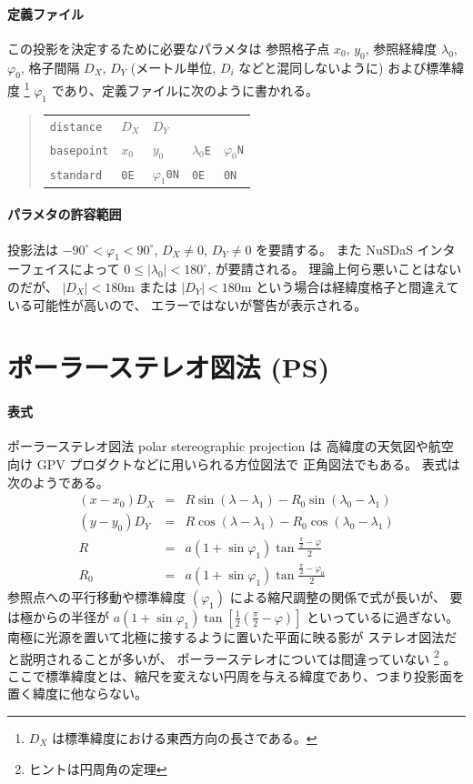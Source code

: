 \paragraph{定義ファイル}
この投影を決定するために必要なパラメタは
参照格子点 \(x_0\), \(y_0\),
参照経緯度 \(\lambda_0\), \(\varphi_0\),
格子間隔 \(D_X\), \(D_Y\) (メートル単位, \(D_i\) などと混同しないように)
および標準緯度%
\footnote{
	$D_X$ は標準緯度における東西方向の長さである。
}%
\(\varphi_1\)
であり、定義ファイルに次のように書かれる。
\begin{quote}
\begin{tabular}{lllll}
{\tt distance}	& $D_X$ & $D_Y$ & & \\
{\tt basepoint}	& $x_0$ & $y_0$	& $\lambda_0${\tt E} & $\varphi_0${\tt N} \\
{\tt standard}	& {\tt 0E} & $\varphi_1${\tt 0N} & {\tt 0E} & {\tt 0N} \\
\end{tabular}
\end{quote}

\paragraph{パラメタの許容範囲}
投影法は
\(-90^\circ < \varphi_1 < 90^\circ\),
\(D_X \ne 0\),
\(D_Y \ne 0\)
を要請する。
また NuSDaS インターフェイスによって
\(0 \le |\lambda_0| < 180^\circ\),
が要請される。
理論上何ら悪いことはないのだが、
\(|D_X| < 180\)m
または
\(|D_Y| < 180\)m
という場合は経緯度格子と間違えている可能性が高いので、
エラーではないが警告が表示される。

\section{ポーラーステレオ図法 (PS)}

\paragraph{表式}
ポーラーステレオ図法 polar stereographic projection は
高緯度の天気図や航空向け GPV プロダクトなどに用いられる方位図法で
正角図法でもある。
表式は次のようである。
\begin{eqnarray}
 (x - x_0) D_X &=& R \sin(\lambda-\lambda_1) - R_0 \sin(\lambda_0-\lambda_1)
\\
 (y - y_0) D_Y &=& R \cos(\lambda-\lambda_1) - R_0 \cos(\lambda_0-\lambda_1)
\\
 R &=& a(1 + \sin\varphi_1) \tan \frac{\frac{\pi}{2} - \varphi}{2}
\\
 R_0 &=& a(1 + \sin\varphi_1) \tan \frac{\frac{\pi}{2} - \varphi_0}{2}
\end{eqnarray}
参照点への平行移動や標準緯度 \((\varphi_1)\) による縮尺調整の関係で式が長いが、
要は極からの半径が \(a(1 + \sin\varphi_1)\tan[\frac{1}{2}(\frac{\pi}{2} - \varphi)]\) 
といっているに過ぎない。
南極に光源を置いて北極に接するように置いた平面に映る影が
ステレオ図法だと説明されることが多いが、
ポーラーステレオについては間違っていない%
\footnote{ヒントは円周角の定理}%
。
ここで標準緯度とは、縮尺を変えない円周を与える緯度であり、つまり投影面を置く緯度に他ならない。

